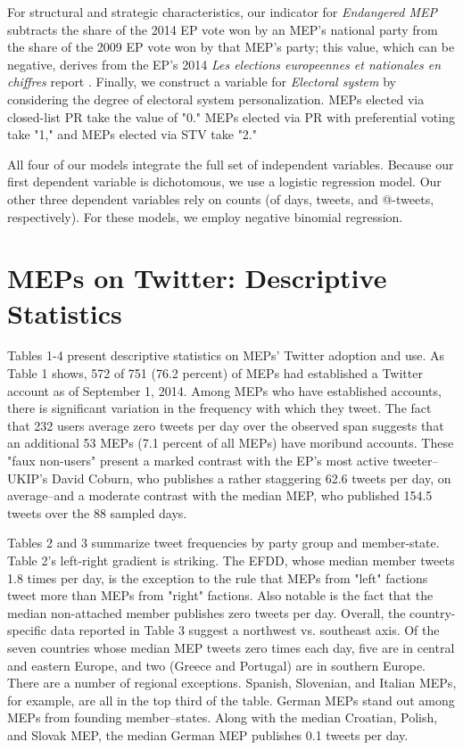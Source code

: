\documentclass[12pt]{article}\usepackage[]{graphicx}\usepackage[]{color}
\begin{document}
    For structural and strategic characteristics, our indicator for \emph{Endangered MEP} subtracts the share of the 2014 EP vote won by an MEP's national party from the share of the 2009 EP vote won by that MEP's party; this value, which can be negative, derives from the EP's 2014 \emph{Les elections europeennes et nationales en chiffres} report \cite{ep.2014}.  Finally, we construct a variable for \emph{Electoral system} by considering the degree of electoral system personalization. MEPs elected via closed-list PR take the value of "0." MEPs elected via PR with preferential voting take "1," and MEPs elected via STV take "2."
    
    All four of our models integrate the full set of independent variables. Because our first dependent variable is dichotomous, we use a logistic regression model. Our other three dependent variables rely on counts (of days, tweets, and @-tweets, respectively). For these models, we employ negative binomial regression.

\section*{MEPs on Twitter: Descriptive Statistics}

    Tables 1-4 present descriptive statistics on MEPs' Twitter adoption and use. As Table 1 shows, 572 of 751 (76.2 percent) of MEPs had established a Twitter account as of September 1, 2014. Among MEPs who have established accounts, there is significant variation in the frequency with which they tweet. The fact that 232 users average zero tweets per day over the observed span suggests that an additional 53 MEPs (7.1 percent of all MEPs) have moribund accounts. These "faux non-users" present a marked contrast with the EP's most active tweeter--UKIP's David Coburn, who publishes a rather staggering 62.6 tweets per day, on average--and a moderate contrast with the median MEP, who published 154.5 tweets over the 88 sampled days.
  
    Tables 2 and 3 summarize tweet frequencies by party group and member-state. Table 2's left-right gradient is striking. The EFDD, whose median member tweets 1.8 times per day, is the exception to the rule that MEPs from "left" factions tweet more than MEPs from "right" factions. Also notable is the fact that the median non-attached member publishes zero tweets per day. Overall, the country-specific data reported in Table 3 suggest a northwest vs. southeast axis. Of the seven countries whose median MEP tweets zero times each day, five are in central and eastern Europe, and two (Greece and Portugal) are in southern Europe. There are a number of regional exceptions. Spanish, Slovenian, and Italian MEPs, for example, are all in the top third of the table. German MEPs stand out among MEPs from founding member--states. Along with the median Croatian, Polish, and Slovak MEP, the median German MEP publishes 0.1 tweets per day.
    
\end{document}
